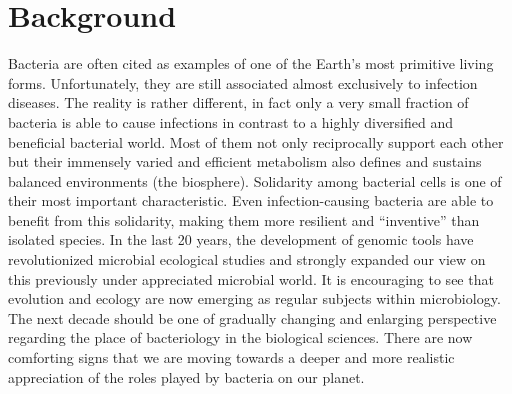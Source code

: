 \logvartrue
\chapter{Background}

Bacteria are often cited as examples of one of the Earth's most primitive living forms. Unfortunately, they are still associated almost exclusively to infection diseases. The reality is rather different, in fact only a very small fraction of bacteria is able to cause infections in contrast to a highly diversified and beneficial bacterial world. Most of them not only reciprocally support each other but their immensely varied and efficient metabolism also defines and sustains balanced environments (the biosphere). Solidarity among bacterial cells is one of their most important characteristic. Even infection-causing bacteria are able to benefit from this solidarity, making them more resilient and ``inventive'' than isolated species. In the last 20 years, the development of genomic tools have revolutionized microbial ecological studies and strongly expanded our view on this previously under appreciated microbial world. It is encouraging to see that evolution and ecology are now emerging as regular subjects within microbiology. The next decade should be one of gradually changing and enlarging perspective regarding the place of bacteriology in the biological sciences. There are now comforting signs that we are moving towards a deeper and more realistic appreciation of the roles played by bacteria on our planet.

